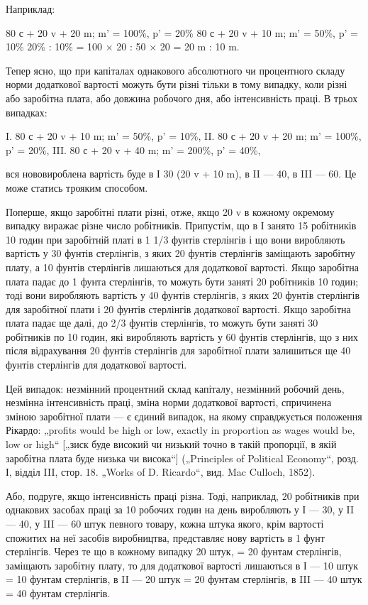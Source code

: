 Наприклад:

80 с + 20 v + 20 m; m' = 100\%, p' = 20\%
80 с + 20 v + 10 m; m' = 50\%, p' = 10\%
20\% : 10\% = 100 × 20 : 50 × 20 = 20 m : 10 m.

Тепер ясно, що при капіталах однакового абсолютного чи
процентного складу норми додаткової вартості можуть бути
різні тільки в тому випадку, коли різні або заробітна плата,
або довжина робочого дня, або інтенсивність праці. В трьох
випадках:

I.  80 с + 20 v + 10 m; m' = 50\%, p' = 10\%,
II. 80 с + 20 v + 20 m; m' = 100\%, p' = 20\%,
III. 80 с + 20 v + 40 m; m' = 200\%, p' = 40\%,

вся нововироблена вартість буде в І 30 (20 v + 10 m), в II — 40,
в III — 60. Це може статись трояким способом.

Поперше, якщо заробітні плати різні, отже, якщо 20 v в кожному
окремому випадку виражає різне число робітників. Припустім,
що в І занято 15 робітників 10 годин при заробітній
платі в 1  1/3  фунтів стерлінгів і що вони виробляють вартість
у 30 фунтів стерлінгів, з яких 20 фунтів стерлінгів заміщають
заробітну плату, а 10 фунтів стерлінгів лишаються для додаткової
вартості. Якщо заробітна плата падає до 1 фунта стерлінгів,
то можуть бути заняті 20 робітників 10 годин; тоді вони
виробляють вартість у 40 фунтів стерлінгів, з яких 20 фунтів
стерлінгів для заробітної плати і 20 фунтів стерлінгів додаткової
вартості. Якщо заробітна плата падає ще далі, до 2/3 фунтів
стерлінгів, то можуть бути заняті 30 робітників по 10 годин,
які виробляють вартість у 60 фунтів стерлінгів, що з них після
відрахування 20 фунтів стерлінгів для заробітної плати залишиться
ще 40 фунтів стерлінгів для додаткової вартості.

Цей випадок: незмінний процентний склад капіталу, незмінний
робочий день, незмінна інтенсивність праці, зміна норми
додаткової вартості, спричинена зміною заробітної плати — є
єдиний випадок, на якому справджується положення Рікардо:
„profits would be high or low, exactly in proportion as wages
would be, low or high“ [„зиск буде високий чи низький точно
в такій пропорції, в якій заробітна плата буде низька чи висока“]
(„Principles of Political Economy“, розд. І, відділ III, стор. 18.
„Works of D. Ricardo“, вид. Mac Culloch, 1852).

Або, подруге, якщо інтенсивність праці різна. Тоді, наприклад,
20 робітників при однакових засобах праці за 10 робочих
годин на день виробляють у І — 30, у II — 40, у III — 60 штук
певного товару, кожна штука якого, крім вартості спожитих
на неї засобів виробництва, представляє нову вартість в 1 фунт
стерлінгів. Через те що в кожному випадку 20 штук, = 20
фунтам стерлінгів, заміщають заробітну плату, то для додаткової
вартості лишаються в І — 10 штук = 10 фунтам стерлінгів,
в II — 20 штук = 20 фунтам стерлінгів, в III — 40 штук = 40 фунтам
стерлінгів.


